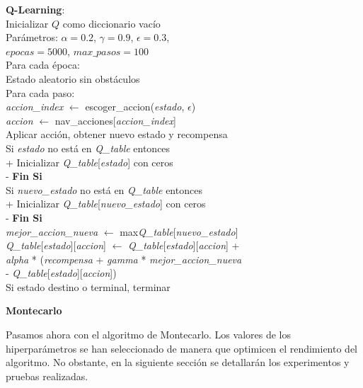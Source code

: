\documentclass[conference,a4paper]{IEEEtran}
\begin{document}
  \begin{pseudo}[compact]
    \textbf{Q-Learning}: \\
    Inicializar $Q$ como diccionario vacío \\
    Parámetros: $\alpha = 0.2$, $\gamma = 0.9$, $\epsilon = 0.3$, \\ $epocas = 5000$, $max\_pasos = 100$ \\
    Para cada época: \\
    \> Estado aleatorio sin obstáculos \\
    \> Para cada paso: \\
    \> \> \textit{accion\_index} $\leftarrow$ escoger\_accion(\textit{estado}, $\epsilon$) \\
    \> \> \textit{accion} $\leftarrow$ nav\_acciones[\textit{accion\_index}] \\
    \> \> Aplicar acción, obtener nuevo estado y recompensa \\
    Si \textit{estado} no está en \textit{Q\_table} entonces \\+
      Inicializar \textit{Q\_table}[\textit{estado}] con ceros \\-
    \textbf{Fin Si} \\
    Si \textit{nuevo\_estado} no está en \textit{Q\_table} entonces \\+
      Inicializar \textit{Q\_table}[\textit{nuevo\_estado}] con ceros \\-
    \textbf{Fin Si} \\
    \textit{mejor\_accion\_nueva} $\leftarrow$ max\textit{Q\_table}[\textit{nuevo\_estado}] \\
    \textit{Q\_table}[\textit{estado}][\textit{accion}] $\leftarrow$ \textit{Q\_table}[\textit{estado}][\textit{accion}] + \\
    \> \textit{alpha} * (\textit{recompensa} + \textit{gamma} * \textit{mejor\_accion\_nueva}\\
    \> - \textit{Q\_table}[\textit{estado}][\textit{accion}])\\
    \> Si estado destino o terminal, terminar \\
  \end{pseudo}

\textbf{\newline Montecarlo}

Pasamos ahora con el algoritmo de Montecarlo. Los valores de los hiperparámetros se han seleccionado de manera que optimicen el rendimiento del algoritmo. 
No obstante, en la siguiente sección se detallarán los experimentos y pruebas realizadas.\newline
\end{document}
